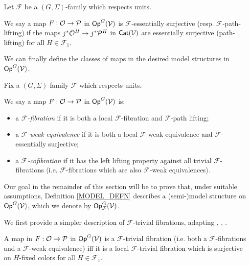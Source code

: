 \documentclass[a4paper,10pt
,draft
]{article}%
\renewcommand{\F}{\mathcal F}
\renewcommand{\1}{\eta}%
\begin{document}
\begin{definition}\label{FESSENSURJ DEF}
Let $\F$ be a $(G, \Sigma)$-family which respects units.

We say a map $F: \mathcal{O} \to \mathcal{P}$ in $\mathsf{Op}^G(\mathcal V)$
is $\F$-essentially surjective (resp. $\F$-path-lifting)
if the maps
$j^{\**}\O^H \to j^{\**} \P^H$
in $\mathsf{Cat}(\mathcal V)$ are essentially surjective (path-lifting) for all $H \in \F_1$.
\end{definition}



We can finally define the classes of maps in the desired model structures in $\mathsf{Op}^G(\mathcal V)$.



\begin{definition}\label{MODEL_DEFN}
Fix a $(G, \Sigma)$-family $\F$ which respects units.

We say a map $F: \mathcal{O} \to \mathcal{P}$ in $\mathsf{Op}^G(\mathcal V)$ is:
\begin{itemize}
	\item a {\em $\F$-fibration} if it is both a local $\F$-fibration and $\F$-path lifting;
	\item a {\em $\F$-weak equivalence} if it is both a local $\F$-weak equivalence and $\F$-essentially surjective;
	\item a \textit{$\F$-cofibration} if it has the left lifting property against all trivial $\F$-fibrations (i.e. $\F$-fibrations which are also $\F$-weak equivalences).
\end{itemize}
\end{definition}


Our goal in the remainder of this section will be to prove that, 
under suitable assumptions, 
Definition \ref{MODEL_DEFN} describes a (semi-)model structure on 
$\mathsf{Op}^G(\mathcal V)$, which we denote by
$\mathsf{Op}^G_{\F}(\V)$.

We first provide a simpler description of $\F$-trivial fibrations,
adapting \cite[4.8]{Cav}, \cite[2.3]{BM13}, \cite[1.18]{CM13b}.

\begin{proposition}\label{FTRIVCHAR PROP}
A map in $F: \mathcal{O} \to \mathcal{P}$ in $\mathsf{Op}^G(\mathcal V)$ is 
a $\F$-trivial fibration (i.e. both a $\F$-fibrations and a $\F$-weak equivalence) 
iff it is a local $\F$-trivial fibration which is surjective on 
$H$-fixed colors for all $H \in \F_1$.
\end{proposition}
\end{document}
